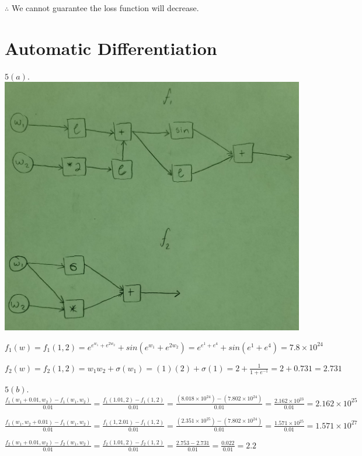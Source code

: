 \documentclass[11pt,english]{article}
\begin{document}
	$\therefore$ We cannot guarantee the loss function will decrease.
\pagebreak

\section{Automatic Differentiation}
	$5(a).$ \\
	
	\includegraphics[scale=0.15]{5a.jpg}
	
	$f_1(w) = f_1(1, 2) = e^{e^{w_1} + e^{2w_2}} + sin(e^{w_1} + e^{2w_2}) = e^{e^{1} + e^{4}} + sin(e^{1} + e^{4}) = 7.8 \times 10^{24}$
	
	$f_2(w) = f_2(1, 2) = w_1w_2 + \sigma(w_1) = (1)(2) + \sigma(1) = 2 + \frac{1}{1+e^{-1}} = 2 + 0.731 = 2.731$\\
	\pagebreak
	
	$5(b).$\\
	
	$\frac{f_1(w_1 + 0.01, w_2) - f_1(w_1, w_2)}{0.01} = \frac{f_1(1.01, 2) - f_1(1, 2)}{0.01} = \frac{(8.018 \times 10^{24}) - (7.802 \times 10^{24})}{0.01} = \frac{2.162\times 10^{23}}{0.01} = 2.162\times 10^{25}$
	
	$\frac{f_1(w_1, w_2 + 0.01) - f_1(w_1, w_2)}{0.01} = \frac{f_1(1, 2.01) - f_1(1, 2)}{0.01} = \frac{(2.351\times 10^{25}) - (7.802 \times 10^{24})}{0.01} = \frac{1.571\times 10^{25}}{0.01} = 1.571\times 10^{27}$
	
	$\frac{f_2(w_1 + 0.01, w_2) - f_2(w_1, w_2)}{0.01} = \frac{f_2(1.01, 2) - f_2(1, 2)}{0.01} = \frac{2.753 - 2.731}{0.01} = \frac{0.022}{0.01} = 2.2$
	
\end{document}
